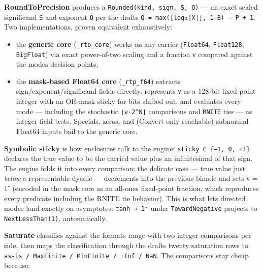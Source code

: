 \textbf{RoundToPrecision} produces a \texttt{Rounded(kind, sign, S, Q)} — an exact scaled significand \texttt{S} and exponent \texttt{Q} per the draft{\textquotesingle}s \texttt{Q = max(⌊log₂|X|⌋, 1−B) − P + 1}. Two implementations, proven equivalent exhaustively:



\begin{itemize}
\item the \textbf{generic core} (\texttt{\_rtp\_core}) works on any carrier (\texttt{Float64}, \texttt{Float128}, \texttt{BigFloat}) via exact power-of-two scaling and a fraction ν compared against the mode{\textquotesingle}s decision points;


\item the \textbf{mask-based Float64 core} (\texttt{\_rtp\_f64}) extracts sign/exponent/significand fields directly, represents ν as a 128-bit fixed-point integer with an OR-mask sticky for bits shifted out, and evaluates every mode — including the stochastic \texttt{⌊ν·2{\textasciicircum}N⌋} comparisons and \texttt{RNITE} ties — as integer field tests. Specials, zeros, and (Convert-only-reachable) subnormal Float64 inputs bail to the generic core.

\end{itemize}


\textbf{Symbolic sticky} is how enclosures talk to the engine: \texttt{sticky ∈ \{−1, 0, +1\}} declares the true value to be the carried value plus an infinitesimal of that sign. The engine folds it into every comparison; the delicate case — true value just \emph{below} a representable dyadic — decrements into the previous binade and sets ν = 1⁻ (encoded in the mask core as an all-ones fixed-point fraction, which reproduces every predicate including the RNITE tie behavior). This is what lets directed modes land exactly on asymptotes: \texttt{tanh → 1⁻} under \texttt{TowardNegative} projects to \texttt{NextLessThan(1)}, automatically.



\textbf{Saturate} classifies against the format{\textquotesingle}s range with two integer comparisons per side, then maps the classification through the draft{\textquotesingle}s twenty saturation rows to \texttt{as-is / MaxFinite / MinFinite / ±Inf / NaN}. The comparisons stay cheap because:



